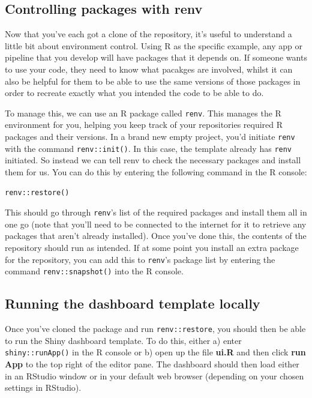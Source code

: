 \documentclass[
  12pt,
]{article}
\begin{document}
\hypertarget{controlling-packages-with-renv}{%
\subsection{Controlling packages with
renv}\label{controlling-packages-with-renv}}

Now that you've each got a clone of the repository, it's useful to
understand a little bit about environment control. Using R as the
specific example, any app or pipeline that you develop will have
packages that it depends on. If someone wants to use your code, they
need to know what pacakges are involved, whilst it can also be helpful
for them to be able to use the same versions of those packages in order
to recreate exactly what you intended the code to be able to do.

To manage this, we can use an R package called \texttt{renv}. This
manages the R environment for you, helping you keep track of your
repositories required R packages and their versions. In a brand new
empty project, you'd initiate \texttt{renv} with the command
\texttt{renv::init()}. In this case, the template already has
\texttt{renv} initiated. So instead we can tell renv to check the
necessary packages and install them for us. You can do this by entering
the following command in the R console:

\begin{verbatim}
renv::restore()
\end{verbatim}

This should go through \texttt{renv}'s list of the required packages and
install them all in one go (note that you'll need to be connected to the
internet for it to retrieve any packages that aren't already installed).
Once you've done this, the contents of the repository should run as
intended. If at some point you install an extra package for the
repository, you can add this to \texttt{renv}'s package list by entering
the command \texttt{renv::snapshot()} into the R console.

\hypertarget{running-the-dashboard-template-locally}{%
\subsection{Running the dashboard template
locally}\label{running-the-dashboard-template-locally}}

Once you've cloned the package and run \texttt{renv::restore}, you
should then be able to run the Shiny dashboard template. To do this,
either a) enter \texttt{shiny::runApp()} in the R console or b) open up
the file \textbf{ui.R} and then click \textbf{run App} to the top right
of the editor pane. The dashboard should then load either in an RStudio
window or in your default web browser (depending on your chosen settings
in RStudio).
\end{document}
